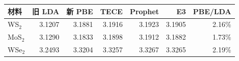 \begin{tabular}{lrrrrrr}
\toprule
材料 & 旧 LDA & 新 PBE & TECE & Prophet & E3 & PBE/LDA \\
\midrule
WS$_2$ & 3.1207 & 3.1881 & 3.1916 & 3.1923 & 3.1905 & 2.16\% \\
MoS$_2$ & 3.1290 & 3.1833 & 3.1898 & 3.1912 & 3.1882 & 1.73\% \\
WSe$_2$ & 3.2493 & 3.3204 & 3.3257 & 3.3267 & 3.3265 & 2.19\% \\
\bottomrule
\end{tabular}
